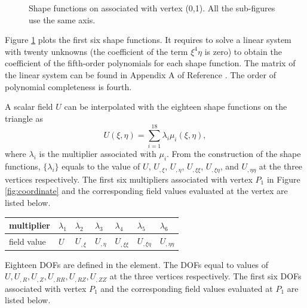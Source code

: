 \documentclass[11pt]{article}  %
\begin{document}
\begin{figure}
\begin{tabular}{cc}
\end{tabular}
\caption{\small{Shape functions on associated with vertex (0,1). All the sub-figures use the same axis.}}
\label{fig:figshape}
\end{figure}

Figure \ref{fig:figshape} plots the first six shape functions. It requires to solve a linear system with twenty unknowns (the coefficient of the term $\xi^4\eta$ is zero) to obtain the  coefficient of the fifth-order polynomials  for each shape function. The matrix of the linear system can be found in Appendix A of Reference \cite{jardin2004triangular}.  The order of polynomial completeness is fourth. 

A scalar field $U$ can be interpolated with the eighteen shape functions on the triangle as
\begin{equation} \label{field}
U(\xi,\eta)=\sum_{i=1}^{18}\lambda_i \mu_i(\xi,\eta),
\end{equation} 
where $\lambda_i$ is the multiplier associated with $\mu_i$. From the construction of the shape functions, $\{\lambda_i\}$ equals to the value of $U$, $U_{,\xi}$, $U_{,\eta}$, $U_{,\xi\xi}$, $U_{,\xi\eta}$, and $U_{,\eta\eta}$ at the three vertices respectively. The first six multipliers associated with vertex $P_1$ in Figure \ref{fig:coordinate} and the corresponding field values evaluated at the vertex are listed below.

\begin{center}
 \begin{tabular}{ |l|l|l|l|l|l|l|}
\hline
 multiplier & $\lambda_1$ & $\lambda_2$ & $\lambda_3$ & $\lambda_4$ & $\lambda_5$ &$\lambda_6$  \\ \hline
 field value & $U$ & $U_{,\xi}$ & $U_{,\eta}$ & $U_{,\xi\xi}$ & $U_{,\xi\eta}$ &$U_{,\eta\eta}$  \\ \hline
\end{tabular}
\end{center}

Eighteen DOFs are defined in the element. The DOFs equal to values of  $U,U_{,R}, U_{,Z}, U_{,RR}, U_{,RZ}, U_{,ZZ}$ at the three vertices respectively. The first six DOFs associated with vertex $P_1$ and the corresponding field values evaluated at $P_1$  are listed below.
\end{document}
